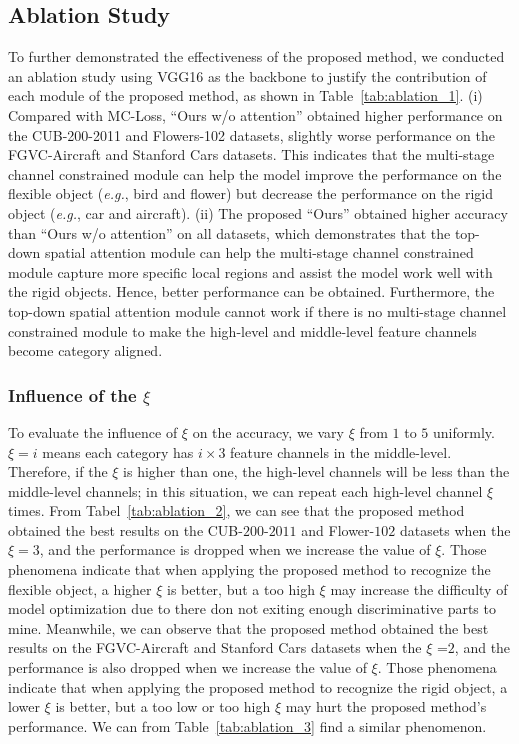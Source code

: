 \documentclass[journal]{IEEEtran}
\begin{document}
\subsection{Ablation Study}\label{sec:ablation}

To further demonstrated the effectiveness of the proposed method, we conducted an ablation study using VGG16 as the backbone to justify the contribution of each module of the proposed method,  as shown in Table~\ref{tab:ablation_1}. (i) Compared with MC-Loss, ``Ours w/o attention'' obtained higher performance on the CUB-200-2011  and Flowers-102 datasets, slightly worse performance on the FGVC-Aircraft and Stanford Cars datasets.  This indicates that the multi-stage channel constrained module can help the model improve the performance on the flexible object (\emph{e.g.}, bird and flower) but decrease the performance on the rigid object (\emph{e.g.}, car and aircraft). (ii) The proposed ``Ours'' obtained higher accuracy than ``Ours w/o attention'' on all datasets, which demonstrates that the top-down spatial attention module can help the multi-stage channel constrained module capture more specific local regions and assist the model work well with the rigid objects. Hence, better performance can be obtained. Furthermore, the top-down spatial attention module cannot work if there is no multi-stage channel constrained module to make the high-level and middle-level feature channels become category aligned.









\subsubsection{Influence of the $\xi$}

To evaluate the influence of $\xi$ on the accuracy, we vary $\xi$ from $1$ to $5$ uniformly. $\xi =i$ means each category has $i \times 3$ feature channels in the middle-level. Therefore, if the $\xi$ is higher than one, the high-level channels will be less than the middle-level channels; in this situation, we can repeat each high-level channel $\xi$ times. 
From Tabel~\ref{tab:ablation_2}, we can see that the proposed method obtained the best results on the CUB-$200$-$2011$ and Flower-$102$ datasets when the $\xi = 3$, and the performance is dropped when we increase the value of $\xi$. Those phenomena indicate that when applying the proposed method to recognize the flexible object, a higher $\xi$ is better, but a  too high $\xi$ may increase the difficulty of model optimization due to there don not exiting enough discriminative parts to mine. Meanwhile, we can observe that the proposed method obtained the best results on the FGVC-Aircraft and Stanford Cars datasets when the $\xi$ =$2$, and the performance is also dropped when we increase the value of $\xi$.  Those phenomena indicate that when applying the proposed method to recognize the rigid object, a lower $\xi$ is better, but a too low or too high $\xi$ may hurt the proposed method's performance.  We can from Table~\ref{tab:ablation_3} find a similar phenomenon.
\end{document}
